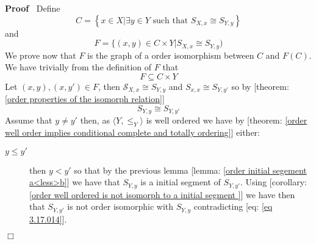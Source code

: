 \documentclass{book}
\newenvironment{proof}{\noindent\textbf{Proof\ }}{\hspace*{\fill}$\Box$\medskip}
\begin{document}
\begin{proof}
  Define
  \begin{equation}
    \label{eq 3.16.016} C = \left\{ x \in X| \exists y \in Y \text{ such that
    } S_{X, x} \cong S_{Y, y} \right\}
  \end{equation}
  and
  \begin{equation}
    \label{eq 3.17.016} F = \{ (x, y) \in C \times Y|S_{X, x} \cong S_{Y, y})
  \end{equation}
  We prove now that $F$ is the graph of a order isomorphism between $C$ and $F
  (C)$. We have trivially from the definition of $F$ that
  \begin{equation}
    \label{eq 3.16.014} F \subseteq C \times Y
  \end{equation}
  Let $(x, y), (x, y') \in F$, then $\mathcal{S}_{X, x} \cong S_{Y, y}$ and
  $S_{x, x} \cong S_{Y, y'}$ so by [theorem: \ref{order properties of the
  isomorph relation}]
  \begin{equation}
    \label{eq 3.17.014} S_{Y, y} {\cong S_{Y, y'}} 
  \end{equation}
  Assume that $y \neq y'$ then, as $\langle Y, \leqslant_Y \rangle$ is well
  ordered we have by [theorem: \ref{order well order implies conditional
  complete and totally ordering}] either:
  \begin{description}
    \item[$y \leqslant y'$] then $y < y'$ so that by the previous lemma
    [lemma: \ref{order initial segement a<less>b}] we have that $S_{Y, y}$ is
    a initial segment of $S_{Y, y'}$. Using [corollary: \ref{order well
    ordered is not isomorph to a initial segment }] we have then that $S_{Y,
    y'}$ is not order isomorphic with $S_{Y, y}$ contradicting [eq: \ref{eq
    3.17.014}].
    

\end{description}
\end{proof}
\end{document}
